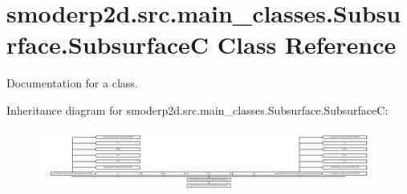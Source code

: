\hypertarget{classsmoderp2d_1_1src_1_1main__classes_1_1Subsurface_1_1SubsurfaceC}{\section{smoderp2d.\-src.\-main\-\_\-classes.\-Subsurface.\-Subsurface\-C Class Reference}
\label{classsmoderp2d_1_1src_1_1main__classes_1_1Subsurface_1_1SubsurfaceC}
}


Documentation for a class.  


Inheritance diagram for smoderp2d.\-src.\-main\-\_\-classes.\-Subsurface.\-Subsurface\-C\-:\begin{figure}[H]
\begin{center}
\leavevmode
\includegraphics[height=2.123894cm]{classsmoderp2d_1_1src_1_1main__classes_1_1Subsurface_1_1SubsurfaceC}
\end{center}
\end{figure}
